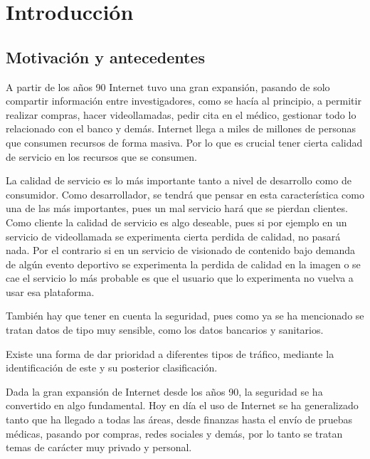 \chapter{Introducción}

\section{Motivación y antecedentes}

A partir de los años 90 Internet tuvo una gran expansión, pasando de solo compartir información entre investigadores, 
como se hacía al principio, a permitir realizar compras, hacer videollamadas, pedir cita en el médico, gestionar 
todo lo relacionado con el banco y demás. Internet 
llega a miles de millones de personas que consumen recursos de forma masiva. Por lo que es crucial tener cierta 
calidad de servicio en los recursos que se consumen.

\intro La calidad de servicio es lo más importante tanto a nivel de desarrollo como de consumidor. Como desarrollador, 
se tendrá que pensar en esta característica como una de las más importantes, pues un mal servicio hará que se pierdan 
clientes. Como cliente la calidad de servicio es algo deseable, pues si por ejemplo en un servicio de videollamada se 
experimenta cierta perdida de calidad, no pasará nada. Por el contrario si en un servicio de visionado de contenido 
bajo demanda de algún evento deportivo se experimenta la perdida de calidad en la imagen o se cae el servicio lo más 
probable es que el usuario que lo experimenta no vuelva a usar esa plataforma.

\intro También hay que tener en cuenta la seguridad, pues como ya se ha mencionado se tratan datos de tipo muy sensible, 
como los datos bancarios y sanitarios.

\intro Existe una forma de dar prioridad a diferentes tipos de tráfico, mediante la identificación de este y su posterior 
clasificación.
















Dada la gran expansión de Internet desde los años 90, la seguridad se ha convertido en algo 
fundamental. Hoy en día el uso de Internet se ha generalizado tanto que ha llegado a todas las áreas, 
desde finanzas hasta el envío de pruebas médicas, pasando por compras, redes sociales y demás, por lo tanto 
se tratan temas de carácter muy privado y personal.

